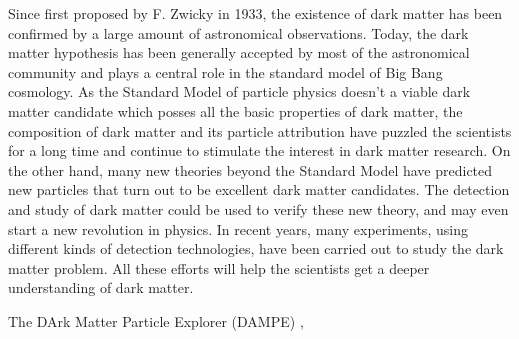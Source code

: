 \begin{eabstract}
Since first proposed by F. Zwicky in 1933, the existence of dark matter has been confirmed by a large amount of astronomical observations.
Today, the dark matter hypothesis has been generally accepted by most of the astronomical community and plays a central role in the standard model of Big Bang cosmology.
As the Standard Model of particle physics doesn't a viable dark matter candidate which posses all the basic properties of dark matter, the composition of dark matter and its particle attribution have puzzled the scientists for a long time and continue to stimulate the interest in dark matter research.
On the other hand, many new theories beyond the Standard Model have predicted new particles that turn out to be excellent dark matter candidates.
The detection and study of dark matter could be used to verify these new theory, and may even start a new revolution in physics.
In recent years, many experiments, using different kinds of detection technologies, have been carried out to study the dark matter problem.
All these efforts will help the scientists get a deeper understanding of dark matter.

The DArk Matter Particle Explorer (DAMPE) ,
\end{eabstract}

